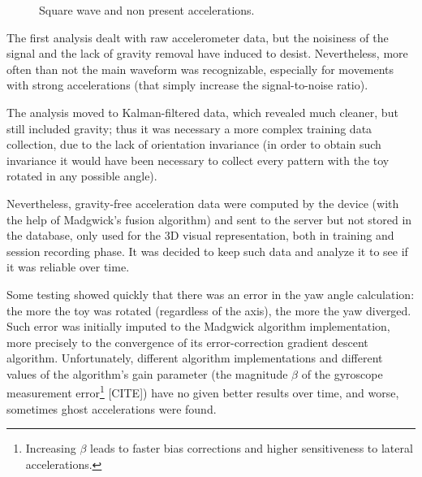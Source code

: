 \begin{center}
	\begin{figure}[ht!]
		\caption{Square wave and non present accelerations.}
	\end{figure}
\end{center}

The first analysis dealt with raw accelerometer data, but the noisiness of the signal and the lack of gravity removal have induced to desist. Nevertheless, more often than not the main waveform was recognizable, especially for movements with strong accelerations (that simply increase the signal-to-noise ratio).
\bigbreak

The analysis moved to Kalman-filtered data, which revealed much cleaner, but still included gravity; thus it was necessary a more complex training data collection, due to the lack of orientation invariance (in order to obtain such invariance it would have been necessary to collect every pattern with the toy rotated in any possible angle).

Nevertheless, gravity-free acceleration data were computed by the device (with the help of Madgwick's fusion algorithm) and sent to the server but not stored in the database, only used for the 3D visual representation, both in training and session recording phase. It was decided to keep such data and analyze it to see if it was reliable over time.
\bigbreak

Some testing showed quickly that there was an error in the yaw angle calculation: the more the toy was rotated (regardless of the axis), the more the yaw diverged. Such error was initially imputed to the Madgwick algorithm implementation, more precisely to the convergence of its error-correction gradient descent algorithm. Unfortunately, different algorithm implementations and different values of the algorithm's gain parameter (the magnitude $\beta$ of the gyroscope measurement error\footnote{Increasing $\beta$ leads to faster bias corrections and higher sensitiveness to lateral accelerations.} [CITE]) have no given better results over time, and worse, sometimes ghost accelerations were found.
\bigbreak

